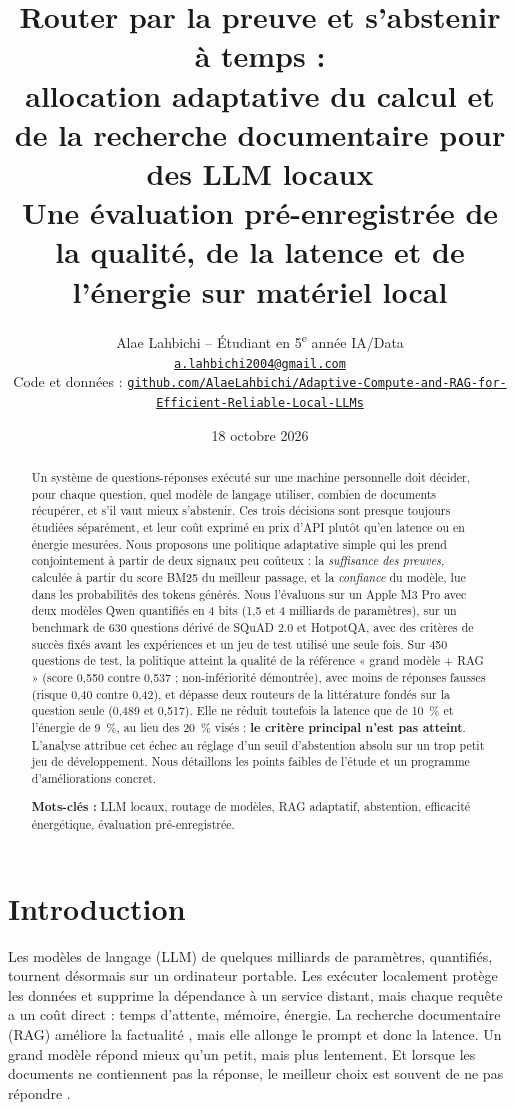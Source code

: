 \documentclass[11pt,a4paper]{article}
\title{\textbf{Router par la preuve et s'abstenir à temps :\\ allocation adaptative du calcul et de la
recherche documentaire pour des LLM locaux}\\[6pt]
\large Une évaluation pré-enregistrée de la qualité, de la latence et de l'énergie sur matériel local}
\author{Alae Lahbichi -- Étudiant en 5\textsuperscript{e} année IA/Data\\[2pt]
\small\href{mailto:a.lahbichi2004@gmail.com}{\texttt{a.lahbichi2004@gmail.com}}\\
\small Code et données : \href{https://github.com/AlaeLahbichi/Adaptive-Compute-and-RAG-for-Efficient-Reliable-Local-LLMs}{\footnotesize\texttt{github.com/AlaeLahbichi/Adaptive-Compute-and-RAG-for-Efficient-Reliable-Local-LLMs}}}
\date{18 octobre 2026}
\begin{document}
\maketitle

\begin{abstract}
\noindent Un système de questions-réponses exécuté sur une machine personnelle doit décider, pour
chaque question, quel modèle de langage utiliser, combien de documents récupérer, et s'il vaut mieux
s'abstenir. Ces trois décisions sont presque toujours étudiées séparément, et leur coût exprimé en prix
d'API plutôt qu'en latence ou en énergie mesurées. Nous proposons une politique adaptative simple qui
les prend conjointement à partir de deux signaux peu coûteux : la \emph{suffisance des preuves},
calculée à partir du score BM25 du meilleur passage, et la \emph{confiance} du modèle, lue dans les
probabilités des tokens générés. Nous l'évaluons sur un Apple M3 Pro avec deux modèles Qwen quantifiés
en 4 bits (1,5 et 4 milliards de paramètres), sur un benchmark de 630 questions dérivé de SQuAD 2.0 et
HotpotQA, avec des critères de succès fixés avant les expériences et un jeu de test utilisé une seule
fois. Sur 450 questions de test, la politique atteint la qualité de la référence « grand modèle + RAG »
(score 0,550 contre 0,537 ; non-infériorité démontrée), avec moins de réponses fausses (risque 0,40
contre 0,42), et dépasse deux routeurs de la littérature fondés sur la question seule (0,489 et 0,517).
Elle ne réduit toutefois la latence que de 10~\% et l'énergie de 9~\%, au lieu des 20~\% visés :
\textbf{le critère principal n'est pas atteint}. L'analyse attribue cet échec au réglage d'un seuil
d'abstention absolu sur un trop petit jeu de développement. Nous détaillons les points faibles de
l'étude et un programme d'améliorations concret.

\medskip
\noindent\textbf{Mots-clés :} LLM locaux, routage de modèles, RAG adaptatif, abstention, efficacité
énergétique, évaluation pré-enregistrée.
\end{abstract}

\clearpage
\tableofcontents
\clearpage

\section{Introduction}

Les modèles de langage (LLM) de quelques milliards de paramètres, quantifiés, tournent désormais sur un
ordinateur portable. Les exécuter localement protège les données et supprime la dépendance à un service
distant, mais chaque requête a un coût direct : temps d'attente, mémoire, énergie. La recherche
documentaire (RAG) améliore la factualité \citep{gao2023ragsurvey}, mais elle allonge le prompt et donc
la latence. Un grand modèle répond mieux qu'un petit, mais plus lentement. Et lorsque les documents ne
contiennent pas la réponse, le meilleur choix est souvent de ne pas répondre \citep{wen2024abstention}.
\end{document}
